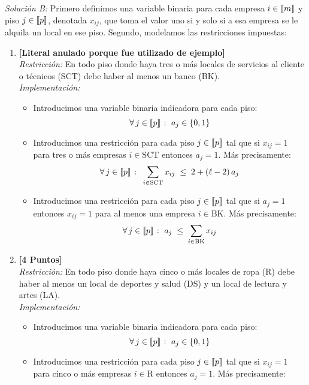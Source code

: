 \documentclass[ a4paper, twoside, 11pt]{article}
\begin{document}
\begin{problem}
\begin{enumerate}[label=\textbf{\alph*)}]
\end{enumerate}

\emph{Soluci\'on B:} Primero definimos una variable binaria para cada empresa $i \in \llbracket m \rrbracket$ y piso $j \in \llbracket p \rrbracket$, denotada $x_{ij}$, que toma el valor uno si y solo si a esa empresa se le alquila un local en ese piso. Segundo, modelamos las restricciones impuestas: 
\begin{enumerate}[label=\textbf{\alph*)}]
\item \textbf{[Literal anulado porque fue utilizado de ejemplo]} \\[1ex]
\emph{Restricci\'on:} En todo piso donde haya tres o m\'as locales de servicios al cliente o t\'ecnicos (SCT) debe haber al menos un banco (BK). \\[1ex]
\emph{Implementaci\'on:}
\begin{itemize}
\item Introducimos una variable binaria indicadora para cada piso: 
\[
\forall \, j \in \llbracket p \rrbracket \; \colon \; a_j \in \{ 0, 1 \}
\]
\item Introducimos una restricci\'on para cada piso $j \in \llbracket p \rrbracket$ tal que si $x_{ij} = 1$ para tres o m\'as empresas $i \in \text{SCT}$ entonces $a_j = 1$. M\'as precisamente: 
\[
\forall \, j \in \llbracket p \rrbracket \; \colon \;
\sum_{  i \in \text{SCT} } x_{ij} \; \leq \; 2 + (\ell - 2) \, a_j
\]
\item Introducimos una restricci\'on para cada piso $j \in \llbracket p \rrbracket$ tal que si $a_j = 1$ entonces $x_{ij} = 1$ para al menos una empresa $i \in \text{BK}$. M\'as precisamente: 
\[
\forall \, j \in \llbracket p \rrbracket \; \colon \;
a_j \; \leq \; \sum_{i \in \text{BK}} x_{ij}
\]
\end{itemize}
\item \textbf{[4 Puntos]} \\[1ex]
\emph{Restricci\'on:} En todo piso donde haya cinco o m\'as locales de ropa (R) debe haber al menos un local de deportes y salud (DS) y un local de lectura y artes (LA). \\[1ex]
\emph{Implementaci\'on:}
\begin{itemize}
\item Introducimos una variable binaria indicadora para cada piso: 
\[
\forall \, j \in \llbracket p \rrbracket \; \colon \; a_j \in \{ 0, 1 \}
\]
\item Introducimos una restricci\'on para cada piso $j \in \llbracket p \rrbracket$ tal que si $x_{ij} = 1$ para cinco o m\'as empresas $i \in \text{R}$ entonces $a_j = 1$. M\'as precisamente: 

\end{itemize}
\end{enumerate}
\end{problem}
\end{document}
